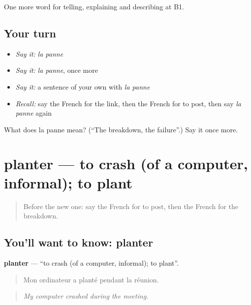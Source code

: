 \begin{grammarlens}[title={What you've built}]
One more word for telling, explaining and describing at B1.
\end{grammarlens}

\subsection*{Your turn}
\begin{itemize}
\raggedright
  \item \emph{Say it:} \emph{la panne}
  \item \emph{Say it:} \emph{la panne}, once more
  \item \emph{Say it:} a sentence of your own with \emph{la panne}
  \item \emph{Recall:} say the French for the link, then the French for to post, then say \emph{la panne} again
\end{itemize}

\begin{tcolorbox}[breakable,colback=teal!4,colframe=teal!35!black,title={Before you move on}]
What does la panne mean? (\textquotedblleft{}The breakdown, the failure\textquotedblright{}.) Say it once more.
\end{tcolorbox}
\section[planter]{planter — to crash (of a computer, informal); to plant}

\label{lesson:FR-C399-planter}



\begin{quote}
Before the new one: say the French for to post, then the French for the breakdown.
\end{quote}

\subsection*{You'll want to know: planter}
\textbf{planter} — \textquotedblleft{}to crash (of a computer, informal); to plant\textquotedblright{}.

\begin{quote}
Mon ordinateur a planté pendant la réunion.
\end{quote}

\begin{quote}
\emph{My computer crashed during the meeting.}
\end{quote}

